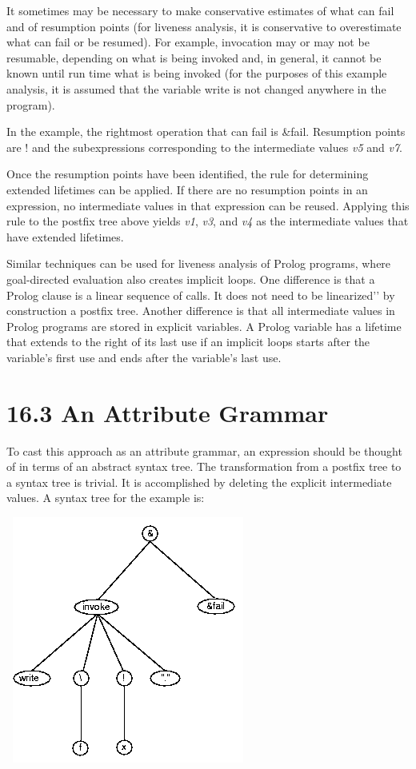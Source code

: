 It sometimes may be necessary to make conservative estimates of what
can fail and of resumption points (for liveness analysis, it is
conservative to overestimate what can fail or be resumed). For
example, invocation may or may not be resumable, depending on what is
being invoked and, in general, it cannot be known until run time what
is being invoked (for the purposes of this example analysis, it is
assumed that the variable write is not changed anywhere in the
program).

In the example, the rightmost operation that can fail is
\&fail. Resumption points are ! and the subexpressions corresponding
to the intermediate values \textit{v5} and \textit{v7}.

Once the resumption points have been identified, the rule for
determining extended lifetimes can be applied. If there are no
resumption points in an expression, no intermediate values in that
expression can be reused. Applying this rule to the postfix tree above
yields \textit{v1}, \textit{v3}, and \textit{v4} as the intermediate
values that have extended lifetimes.

Similar techniques can be used for liveness analysis of Prolog
programs, where goal-directed evaluation also creates implicit
loops. One difference is that a Prolog clause is a linear sequence of
calls. It does not need to be
{\textasciigrave}{\textasciigrave}linearized'{}' by construction a
postfix tree. Another difference is that all intermediate values in
Prolog programs are stored in explicit variables. A Prolog variable
has a lifetime that extends to the right of its last use if an
implicit loops starts after the variable's first use and ends after
the variable's last use.


\section[16.3 An Attribute Grammar]{16.3 An Attribute Grammar}

To cast this approach as an attribute grammar, an expression should be
thought of in terms of an abstract syntax tree.  The transformation
from a postfix tree to a syntax tree is trivial. It is accomplished by
deleting the explicit intermediate values. A syntax tree for the
example is:

\includegraphics[width=3.1638in,height=3.198in]{kw/figure4-4.png}

